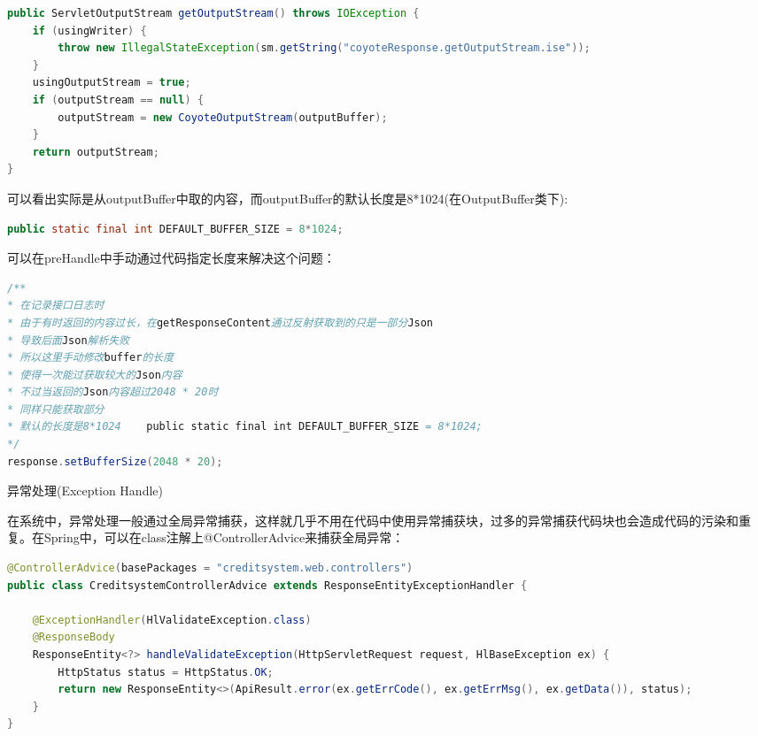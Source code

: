\documentclass[12pt]{book}
\makeatletter
\numberwithin{dummy}{section}
\theoremstyle{ocrenumbox}
\theoremstyle{blacknumex}
\theoremstyle{blacknumbox}
\theoremstyle{ocrenum}
\renewcommand{\subsection}{\@startsection {subsection}{2}{\z@}
	{-3ex \@plus -0.1ex \@minus -.4ex}
	{0.5ex \@plus.2ex }
	{\normalfont\sffamily\bfseries}}
\newlength\esp
\makeatother
\begin{document}
\begin{lstlisting}[language=Java]
public ServletOutputStream getOutputStream() throws IOException {
	if (usingWriter) {
		throw new IllegalStateException(sm.getString("coyoteResponse.getOutputStream.ise"));
	}
	usingOutputStream = true;
	if (outputStream == null) {
		outputStream = new CoyoteOutputStream(outputBuffer);
	}
	return outputStream;
}
\end{lstlisting}

可以看出实际是从outputBuffer中取的内容，而outputBuffer的默认长度是8*1024(在OutputBuffer类下):

\begin{lstlisting}[language=Java]
public static final int DEFAULT_BUFFER_SIZE = 8*1024;
\end{lstlisting}

可以在preHandle中手动通过代码指定长度来解决这个问题：

\begin{lstlisting}[language=Java]
/**
* 在记录接口日志时
* 由于有时返回的内容过长，在getResponseContent通过反射获取到的只是一部分Json
* 导致后面Json解析失败
* 所以这里手动修改buffer的长度
* 使得一次能过获取较大的Json内容
* 不过当返回的Json内容超过2048 * 20时
* 同样只能获取部分
* 默认的长度是8*1024    public static final int DEFAULT_BUFFER_SIZE = 8*1024;
*/
response.setBufferSize(2048 * 20);
\end{lstlisting}

\subsection{异常处理(Exception Handle)}

在系统中，异常处理一般通过全局异常捕获，这样就几乎不用在代码中使用异常捕获块，过多的异常捕获代码块也会造成代码的污染和重复。在Spring中，可以在class注解上@ControllerAdvice来捕获全局异常：

\begin{lstlisting}[language=Java]
@ControllerAdvice(basePackages = "creditsystem.web.controllers")
public class CreditsystemControllerAdvice extends ResponseEntityExceptionHandler {

	@ExceptionHandler(HlValidateException.class)
	@ResponseBody
	ResponseEntity<?> handleValidateException(HttpServletRequest request, HlBaseException ex) {
		HttpStatus status = HttpStatus.OK;
		return new ResponseEntity<>(ApiResult.error(ex.getErrCode(), ex.getErrMsg(), ex.getData()), status);
	}
}
\end{lstlisting}
\end{document}

